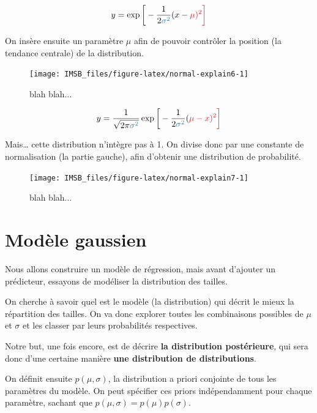 \documentclass[
  a4paper,11pt,twoside,onecolumn,openright,final,oldfontcommands]{memoir}
\theoremstyle{definition}
\theoremstyle{definition}
\theoremstyle{definition}
\theoremstyle{definition}
\theoremstyle{remark}
\begin{document}
\[
y = \exp \bigg [- \frac{1}{2 \color{steelblue}{\sigma^{2}}} (x - \color{orangered}{\mu})^{2} \bigg]
\]

On insère ensuite un paramètre \(\mu\) afin de pouvoir contrôler la position (la tendance centrale) de la distribution.

\begin{figure}[!htb]

{\centering \texttt{[image: IMSB\_files/figure-latex/normal-explain6-1]} 

}

\caption{blah blah...}\label{fig:normal-explain6}
\end{figure}

\[
y = \frac{1}{\sqrt{2 \pi \color{steelblue}{\sigma^{2}}}} \exp \bigg[-\frac{1}{2 \color{steelblue}{\sigma^{2}}} (\color{orangered}{\mu} - x)^{2} \bigg]
\]

Mais\ldots{} cette distribution n'intègre pas à 1. On divise donc par une constante de normalisation (la partie gauche), afin d'obtenir une distribution de probabilité.

\begin{figure}[!htb]

{\centering \texttt{[image: IMSB\_files/figure-latex/normal-explain7-1]} 

}

\caption{blah blah...}\label{fig:normal-explain7}
\end{figure}

\hypertarget{moduxe8le-gaussien}{%
\section{Modèle gaussien}\label{moduxe8le-gaussien}}

Nous allons construire un modèle de régression, mais avant d'ajouter un prédicteur, essayons de modéliser la distribution des tailles.

On cherche à savoir quel est le modèle (la distribution) qui décrit le mieux la répartition des tailles. On va donc explorer toutes les combinaisons possibles de \(\mu\) et \(\sigma\) et les classer par leurs probabilités respectives.

Notre but, une fois encore, est de décrire \textbf{la distribution postérieure}, qui sera donc d'une certaine manière \textbf{une distribution de distributions}.

On définit ensuite \(p(\mu,\sigma)\), la distribution a priori conjointe de tous les paramètres du modèle. On peut spécifier ces priors indépendamment pour chaque paramètre, sachant que \(p(\mu, \sigma) = p(\mu) p(\sigma)\).
\end{document}

